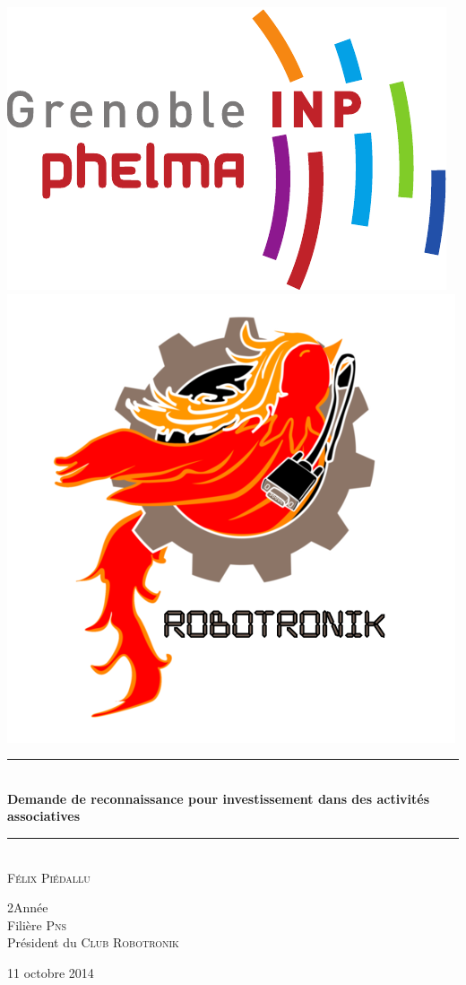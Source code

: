 \begin{titlepage}
\includegraphics[scale=0.45]{Public/logo_phelma.pdf}\hfill\includegraphics[scale=0.55]{Public/logo_robotronik.png}
\begin{center}
    \vspace*{2cm}
    \rule{\linewidth}{0.5mm}\\[0.4cm]
    {\huge\bfseries Demande de reconnaissance pour investissement dans des activités associatives\\
    [0.4cm]}\rule{\linewidth}{0.5mm}\\[1.0cm]
    \large{\textsc{Félix Piédallu}}
    \begin{flushright} \large
        2\ieme Année \\
        Filière \textsc{Pns} \\
        Président du \textsc{Club Robotronik}\\
    \end{flushright}
    \vfill

    \large{11 octobre 2014}
\end{center}
\end{titlepage}
